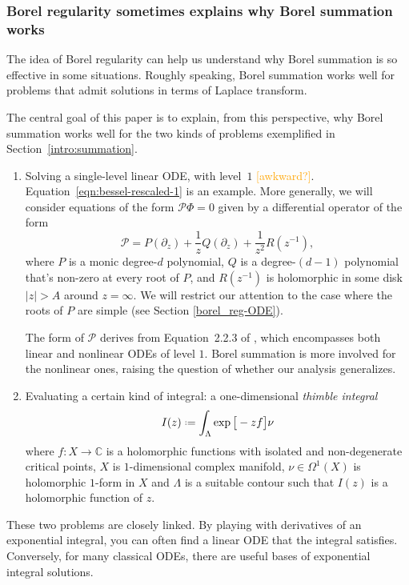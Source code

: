 \documentclass{article}
\newcommand*{\defeq}{\mathrel{\vcenter{\baselineskip0.5ex \lineskiplimit0pt
                     \hbox{\scriptsize.}\hbox{\scriptsize.}}}%
                     =}
\theoremstyle{definition}
\theoremstyle{plain}
\begin{document}
\subsubsection{Borel regularity sometimes explains why Borel summation works}\label{borel-reg:explanatory-power}
The idea of Borel regularity can help us understand why Borel summation is so effective in some situations. Roughly speaking, Borel summation works well for problems that admit solutions in terms of Laplace transform. 

The central goal of this paper is to explain, from this perspective, why Borel summation works well for the two kinds of problems exemplified in Section~\ref{intro:summation}.
\begin{enumerate}
\item Solving a single-level linear ODE, with level~$1$ \cite[Section 2.1]{EcalleIII}\cite[Section~5.2.2.1]{diverg-resurg-iii} \textcolor{orange}{[awkward?]}. Equation~\eqref{eqn:bessel-rescaled-1} is an example. More generally, we will consider equations of the form $\mathcal{P} \Phi = 0$ given by a differential operator of the form
\[ \mathcal{P} = P(\partial_z) + \frac{1}{z} Q(\partial_z) + \frac{1}{z^2} R(z^{-1}), \]
where $P$ is a monic degree-$d$ polynomial, $Q$ is a degree-$(d-1)$ polynomial that's non-zero at every root of $P$, and $R(z^{-1})$ is holomorphic in some disk $|z| > A$ around $z = \infty$. We will restrict our attention to the case where the roots of $P$ are simple (see Section \ref{borel_reg-ODE}).

The form of $\mathcal{P}$ derives from Equation~2.2.3 of \cite[pag. 105]{EcalleIII}, which encompasses both linear and nonlinear ODEs of level $1$. Borel summation is more involved for the nonlinear ones, raising the question of whether our analysis generalizes.
%
\item Evaluating a certain kind of integral: a one-dimensional {\em thimble integral}
%
\begin{equation*}
I(z)\defeq\int_{\Lambda}\exp\big[-z f\big] \nu
\end{equation*}
where $f\colon X\to \mathbb{C}$ is a holomorphic functions with isolated and non-degenerate critical points, $X$ is $1$-dimensional complex manifold, $\nu\in\Omega^1(X)$ is holomorphic $1$-form in $X$ and $\Lambda$ is a suitable contour such that $I(z)$ is a holomorphic function of $z$.  
\end{enumerate}
These two problems are closely linked. By playing with derivatives of an exponential integral, you can often find a linear ODE that the integral satisfies. Conversely, for many classical ODEs, there are useful bases of exponential integral solutions.
\end{document}
